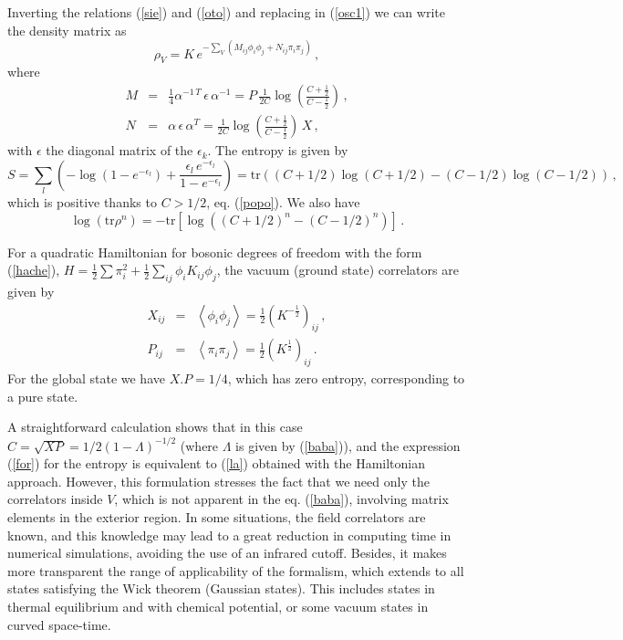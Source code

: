 \documentclass[11pt]{article}
\begin{document}
 Inverting the relations (\ref{sie}) and (\ref{oto}) and replacing in (\ref{osc1}) we can write the density matrix as
\begin{equation}
\rho _{V}=K\,e^{-\sum_V \left( M_{ij} \phi_i \phi_j + N_{ij} \pi_i \pi_j \right)}\,,  \label{osc}
\end{equation}
where
\begin{eqnarray}
M&=&\frac{1}{4} \alpha^{-1\,T} \,\epsilon \,\alpha^{-1}=P\,\frac{1}{2 C}\log\left(\frac{C+\frac{1}{2}}{C-\frac{1}{2}}\right)\,,\\
N&=&\alpha \,\epsilon \,\alpha^T=\frac{1}{2 C}\log\left(\frac{C+\frac{1}{2}}{C-\frac{1}{2}}\right)\,X\,,
\end{eqnarray}
with $\epsilon$ the diagonal matrix of the $\epsilon_k$. The entropy is given by
\begin{equation}
S=\sum_l \left(-\log (1-e^{-\epsilon _{l}})+\frac{\epsilon _{l}\, e^{-\epsilon _{l}}}{
1-e^{-\epsilon _{l}}}\right)=\textrm{tr}\left(( C+1/2)\log (C+1/2)-(C-1/2)\log (C-1/2)\right)\,,  \label{for}
\end{equation}
which is positive thanks to  $C >1/2$, eq. (\ref{popo}). We also have
\begin{equation} 
\log (\textrm{tr}\rho^n)=-\textrm{tr}\left[ \log\left((C+1/2)^n-(C-1/2)^n\right)\right]\,.
\end{equation}

For a quadratic Hamiltonian for bosonic degrees of freedom with the form (\ref{hache}),   
$
H=\frac{1}{2}\sum \pi _{i}^{2}+\frac{1}{2}\sum_{ij}\phi _{i}K_{ij}\phi
_{j}$, the vacuum (ground state) correlators are given by 
\begin{eqnarray}
X_{ij} &=&\left\langle \phi _{i}\phi _{j}\right\rangle =\frac{1}{2}(K^{-
\frac{1}{2}})_{ij}\,,  \label{x} \\
P_{ij} &=&\left\langle \pi _{i}\pi _{j}\right\rangle =\frac{1}{2}(K^{\frac{1
}{2}})_{ij}\,. \label{p}
\end{eqnarray}
For the global state we have $X.P=1/4$, which has zero entropy, corresponding to a pure state. 

A straightforward calculation shows that in this case $C=\sqrt{XP}=1/2(1-\Lambda)^{-1/2}$ (where $\Lambda$ is given by (\ref{baba})), and the expression (\ref{for}) for the entropy is equivalent to (\ref{la}) obtained with the Hamiltonian approach. However, this formulation stresses the fact that we need only the correlators inside $V$, which is not apparent in the eq. (\ref{baba}), involving matrix elements in the exterior region. In some situations, the field correlators are known, and this knowledge may lead to a great reduction in computing time in numerical simulations, avoiding the use of an infrared cutoff. Besides, it makes more transparent the range of applicability of the formalism, which extends to all states satisfying the Wick theorem (Gaussian states). This includes states in thermal equilibrium and with chemical potential, or some vacuum states in curved space-time. 
 
\end{document}
